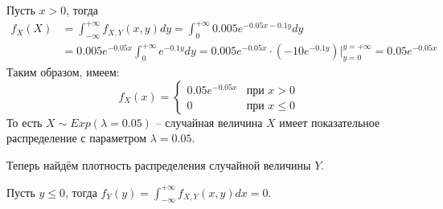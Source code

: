 \begin{enumerate}
\begin{enumerate}
Пусть $x >0 $, тогда
\begin{align*}
f_X (X) &= \int_{-\infty}^{+\infty} f_{X, Y} (x, y) dy = \int_{0}^{+\infty} 0.005 e^{-0.05x-0.1y} dy \\
&= 0.005e^{-0.05x} \int_{0}^{+\infty} e^{-0.1y} dy = 0.005e^{-0.05x} \cdot \left(-10e^{-0.1y} \right) \bigg\vert_{y=0}^{y=+\infty} = 0.05 e^{-0.05x}
\end{align*}
Таким образом, имеем:
\[
f_X (x) = \begin{cases}
0.05 e^{-0.05x} & \text{при } x>0 \\
0 & \text{при } x \leq 0
\end{cases}
\]
То есть $X \sim Exp(\lambda=0.05)$ – случайная величина $X$ имеет показательное
распределение с параметром $\lambda = 0.05$.

Теперь найдём плотность распределения случайной величины $Y$.

Пусть $y \leq 0 $, тогда $f_Y (y) = \int_{-\infty}^{+\infty} f_{X, Y} (x, y) dx  = 0$.


\end{enumerate}
\end{enumerate}
